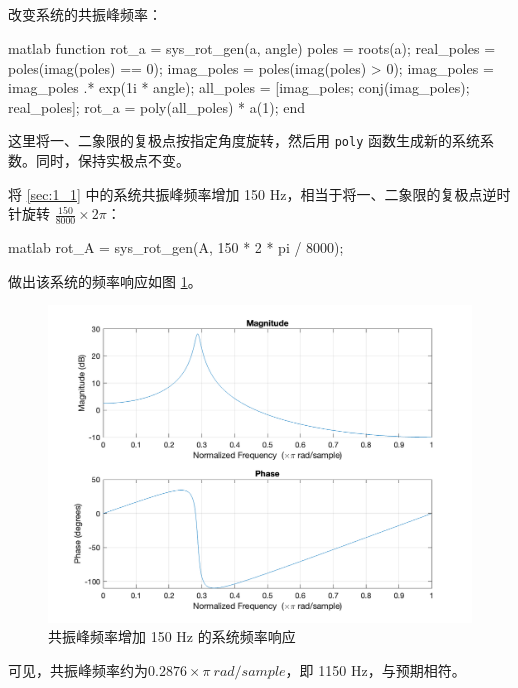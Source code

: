 \documentclass[a4paper]{article}  %
\begin{document}
\subsection{}

改变系统的共振峰频率：
\begin{codeblock}{matlab}
function rot_a = sys_rot_gen(a, angle)
    poles = roots(a);
    real_poles = poles(imag(poles) == 0);
    imag_poles = poles(imag(poles) > 0);
    imag_poles = imag_poles .* exp(1i * angle);
    all_poles = [imag_poles; conj(imag_poles); real_poles];
    rot_a = poly(all_poles) * a(1);
end
\end{codeblock}

这里将一、二象限的复极点按指定角度旋转，然后用 \texttt{poly} 函数生成新的系统系数。同时，保持实极点不变。

将 \ref{sec:1_1} 中的系统共振峰频率增加 150 Hz，相当于将一、二象限的复极点逆时针旋转 $\frac{150}{8000} \times 2\pi$：
\begin{codeblock}{matlab}
rot_A = sys_rot_gen(A, 150 * 2 * pi / 8000);
\end{codeblock}

做出该系统的频率响应如图 \ref{fig:1_12_freqz}。

\begin{figure}[ht]
    \centering
    \includegraphics[width=.6\textwidth]{asserts/1_12_freqz.png}
    \caption{
        共振峰频率增加 150 Hz 的系统频率响应
    }\label{fig:1_12_freqz}
\end{figure}

可见，共振峰频率约为$0.2876\times \pi\ rad/sample$，即 1150 Hz，与预期相符。

\subsection{}
\end{document}
